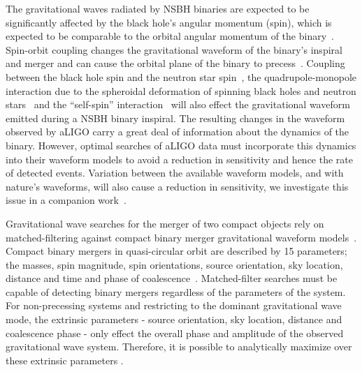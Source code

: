 The gravitational waves radiated by \ac{NSBH} binaries are expected to be
significantly affected by the black hole's angular momentum
(spin), which is expected to be comparable to the orbital angular momentum of
the binary~\cite{Cutler:1992tc,Apostolatos:1994mx,Kidder:1992fr,Kidder:1995zr}.
Spin-orbit coupling changes the gravitational waveform of the binary's inspiral
and merger and can cause the orbital plane of the binary to
precess~\cite{Apostolatos:1994mx}. Coupling between the black hole spin and the
neutron star spin~\cite{Kidder:1995zr}, the quadrupole-monopole interaction due
to the spheroidal deformation of spinning black holes and neutron
stars~\cite{Poisson:1997ha} and the ``self-spin''
interaction~\cite{Mikoczi:2005dn} will also effect the gravitational waveform
emitted during a \ac{NSBH} binary inspiral.
The resulting changes in the waveform observed by \ac{aLIGO}
carry a great deal of information about the dynamics of the binary. However,
optimal searches of \ac{aLIGO} data must incorporate this dynamics into their
waveform models to avoid a reduction in sensitivity and hence the rate of
detected events. Variation between the available waveform models, and with 
nature's waveforms, will also cause a reduction in sensitivity, we investigate 
this issue in a companion work~\cite{Nitz:2013mxa}.

Gravitational wave searches for the merger of two compact objects rely on
matched-filtering against compact binary merger gravitational waveform
models~\cite{Wainstein,Helstrom,Allen:2005fk}.
Compact binary mergers in quasi-circular orbit are described by 15
parameters; the masses, spin magnitude, spin orientations, source orientation,
sky location, distance and time and phase of
coalescence~\cite{Peters:1963ux,Th300}. Matched-filter
searches must be capable of detecting binary mergers regardless of the
parameters of the system. For non-precessing systems and restricting to the
dominant gravitational wave mode, the extrinsic parameters - source orientation,
sky location, distance and coalescence phase - only effect the overall phase and
amplitude of the observed gravitational wave system. Therefore, it is possible
to analytically maximize over these extrinsic parameters \cite{Allen:2005fk}.

